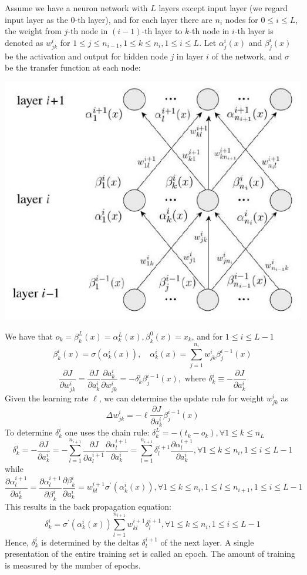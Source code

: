 \documentclass{article} %
\begin{document}
Assume we have a neuron network with $L$ layers except input layer (we regard input layer as the $0$-th layer), and for each layer there are $n_i$ nodes for $ 0 \le i \le L $, the weight from $j$-th node in $(i-1)$-th layer to $k$-th node in $i$-th layer is denoted as $w_{jk}^i$ for $ 1 \le j \le n_{i-1}, 1 \le k \le n_i, 1 \le i \le L  $.
Let $ \alpha_j^i(x) $ and $ \beta_j^i(x) $ be the activation and output for hidden node $j$ in layer $i$ of the network, and $\sigma$ be the transfer function at each node:
\begin{center}
\includegraphics[width=0.6\linewidth]{back_propagation.jpg}
\end{center}
We have that $ o_k = \beta_k^L(x) = \alpha_k^L(x), \beta_k^0(x) = x_k $, and for $ 1 \le i \le L-1 $
\[ \beta_k^i(x) = \sigma(\alpha_k^i(x)), \quad \alpha_k^i(x) = \sum_{j=1}^{n_i} w_{jk}^i \beta_j^{i-1}(x) \]
\[ \frac{\partial J}{\partial w_{jk}^i} = \frac{\partial J}{\partial a_k^i} \frac{\partial a_k^i}{\partial w_{jk}^i} = -\delta_k^i \beta_j^{i-1}(x), \textrm{ where } \delta_k^i \equiv -\frac{\partial J}{\partial a_k^i} \]
Given the learning rate $\ell$, we can determine the update rule for weight $w_{jk}^i$ as
\[ \Delta w_{jk}^i = - \ell \frac{\partial J}{\partial a_k^i} \beta_j^{i-1}(x) \]
To determine $\delta_k^i$ one uses the chain rule: $ \delta_k^L = - (t_k - o_k), \forall 1 \le k \le n_L $
\[ \delta_k^i = -\frac{\partial J}{\partial a_k^i} = - \sum_{l=1}^{n_{i+1}} \frac{\partial J}{\partial a_l^{i+1}} \frac{\partial \alpha_l^{i+1}}{\partial a_k^i} = \sum_{l=1}^{n_{i+1}} \delta_l^{i+1} \frac{\partial \alpha_l^{i+1}}{\partial a_k^i}, \forall 1 \le k \le n_i, 1 \le i \le L-1 \]
while
\[ \frac{\partial \alpha_l^{i+1}}{\partial a_k^i} =  \frac{\partial \alpha_l^{i+1}}{\partial \beta_k^i}  \frac{\partial \beta_k^i}{\partial a_k^i} = w_{kl}^{i+1} \sigma^\prime(\alpha_k^i(x)), \forall 1 \le k \le n_i, 1 \le l \le n_{i+1}, 1 \le i \le L-1 \]
This results in the back propagation equation:
\[ \delta_k^i = \sigma^\prime(\alpha_k^i(x)) \sum_{l=1}^{n_{i+1}} w_{kl}^{i+1} \delta_l^{i+1}, \forall 1 \le k \le n_i, 1 \le i \le L-1 \]
Hence, $\delta_k^i$ is determined by the deltas $\delta_l^{i+1}$ of the next layer.
A single presentation of the entire training set is called an epoch. The amount of training is measured by the number of epochs.
\end{document}

